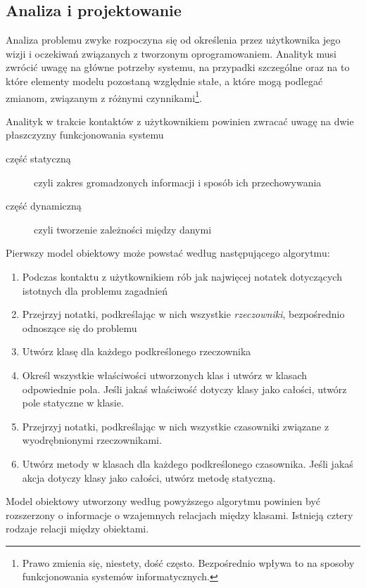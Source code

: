 \subsection{Analiza i projektowanie}

Analiza problemu zwyke rozpoczyna się od określenia przez użytkownika jego wizji i oczekiwań związanych
z tworzonym oprogramowaniem. Analityk musi zwrócić uwagę na główne potrzeby systemu, na przypadki 
szczególne oraz na to które elementy modelu pozostaną względnie stałe, a które mogą podlegać zmianom,
związanym z różnymi czynnikami\footnote{Prawo zmienia się, niestety, dość często. Bezpośrednio
wpływa to na sposoby funkcjonowania systemów informatycznych.}.

Analityk w trakcie kontaktów z użytkownikiem powinien zwracać uwagę na dwie płaszczyzny funkcjonowania systemu
\begin{description}
\item [część statyczną] czyli zakres gromadzonych informacji i sposób ich przechowywania
\item [część dynamiczną] czyli tworzenie zależności między danymi 
\end{description}

Pierwszy model obiektowy może powstać według następującego algorytmu:
\begin{enumerate}
\item Podczas kontaktu z użytkownikiem rób jak najwięcej notatek dotyczących istotnych dla problemu zagadnień
\item Przejrzyj notatki, podkreślając w nich wszystkie {\em rzeczowniki}, bezpośrednio odnoszące się do
problemu
\item Utwórz klasę dla każdego podkreślonego rzeczownika
\item Określ wszystkie właściwości utworzonych klas i utwórz w klasach odpowiednie pola. Jeśli
jakaś właściwość dotyczy klasy jako całości, utwórz pole statyczne w klasie.
\item Przejrzyj notatki, podkreślając w nich wszystkie czasowniki związane z wyodrębnionymi
rzeczownikami. 
\item Utwórz metody w klasach dla każdego podkreślonego czasownika. Jeśli jakaś akcja dotyczy klasy
jako całości, utwórz metodę statyczną.
\end{enumerate}

Model obiektowy utworzony według powyższego algorytmu powinien być rozszerzony o informacje 
o wzajemnych relacjach między klasami. Istnieją cztery rodzaje relacji między obiektami.

